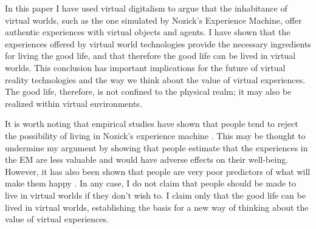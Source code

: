 In this paper I have used virtual digitalism to argue that the inhabitance of
virtual worlds, such as the one simulated by Nozick's Experience Machine, offer
authentic experiences with virtual objects and agents. I have shown that the 
experiences offered by virtual world technologies provide the necessary 
ingredients for living the good life, and that therefore the good life can be
lived in virtual worlds. This conclusion has important implications for the
future of virtual reality technologies and the way we think about the value of
virtual experiences. The good life, therefore, is not confined to the physical
realm; it may also be realized within virtual environments.

It is worth noting that empirical studies have shown that people tend to reject
the possibility of living in Nozick's experience machine \citep{Hindriks2018}.
This may be thought to undermine my argument by showing that people estimate
that the experiences in the EM are less valuable and would have adverse effects
on their well-being. However, it has also been shown that people are very poor
predictors of what will make them happy \citep{Gilbert2005}. In any case, 
I do not claim that people should be made to live in virtual worlds if they 
don't wish to. I claim only that the good life can be lived in virtual worlds,
establishing the basis for a new way of thinking about the value of virtual
experiences.
